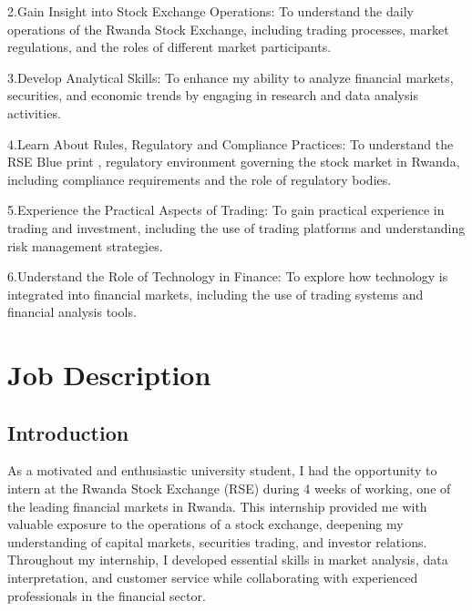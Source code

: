 \documentclass{article}
\begin{document}
\begin{titlepage}
\begin{titlepage}
\begin{titlepage}
\begin{flushleft}
2.Gain Insight into Stock Exchange Operations:
To understand the daily operations of the Rwanda Stock Exchange, including trading processes, market regulations, and the roles of different market participants.
\vspace{0.2cm}

3.Develop Analytical Skills:
To enhance my ability to analyze financial markets, securities, and economic trends by engaging in research and data analysis activities.
\vspace{0.2cm}

4.Learn About Rules, Regulatory and Compliance Practices:
To understand the RSE Blue print  , regulatory environment governing the stock market in Rwanda, including compliance requirements and the role of regulatory bodies.
\vspace{0.2cm}

5.Experience the Practical Aspects of Trading:
To gain practical experience in trading and investment, including the use of trading platforms and understanding risk management strategies.
\vspace{0.2cm}

6.Understand the Role of Technology in Finance:
To explore how technology is integrated into financial markets, including the use of trading systems and financial analysis tools.


\newpage

  \section{{\textbf{\huge{Job Description}}}}
  
\subsection{\Large{\textbf{Introduction}}}
\vspace{0.3cm}

As a motivated and enthusiastic university student, I had the opportunity to intern at the Rwanda Stock Exchange (RSE) during 4 weeks of working, one of the leading financial markets in Rwanda. This internship provided me with valuable exposure to the operations of a stock exchange, deepening my understanding of capital markets, securities trading, and investor relations. Throughout my internship, I developed essential skills in market analysis, data interpretation, and customer service while collaborating with experienced professionals in the financial sector. 
\vspace{0.3cm}


\end{flushleft}
\end{titlepage}
\end{titlepage}
\end{titlepage}
\end{document}

